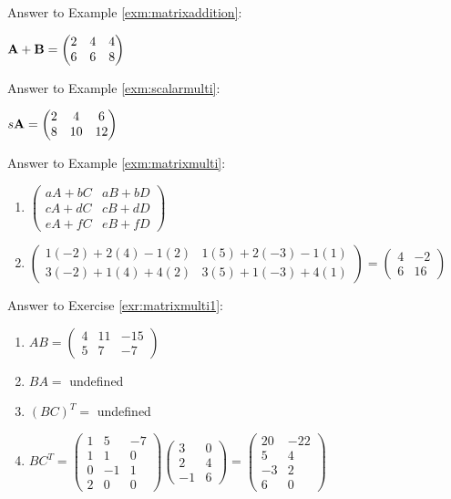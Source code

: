 \documentclass[]{book}
\theoremstyle{definition}
\theoremstyle{definition}
\theoremstyle{definition}
\theoremstyle{remark}
\begin{document}
Answer to Example \ref{exm:matrixaddition}:

\({\bf A+B}=\begin{pmatrix} 2 & 4 & 4 \\ 6 & 6 & 8 \end{pmatrix}\)

Answer to Example \ref{exm:scalarmulti}:

\(s {\bf A} = \begin{pmatrix} 2 & 4 & 6 \\ 8 & 10 & 12 \end{pmatrix}\)

Answer to Example \ref{exm:matrixmulti}:

\begin{enumerate}
\def\labelenumi{\arabic{enumi}.}
\item
  \(\begin{pmatrix} aA+bC&aB+bD\\cA+dC&cB+dD\\eA+fC&eB+fD \end{pmatrix}\)
\item
  \(\begin{pmatrix} 1(-2)+2(4)-1(2)&1(5)+2(-3)-1(1)\\  3(-2)+1(4)+4(2)&3(5)+1(-3)+4(1)\end{pmatrix} =  \begin{pmatrix} 4&-2\\6&16\end{pmatrix}\)
\end{enumerate}

Answer to Exercise \ref{exr:matrixmulti1}:

\begin{enumerate}
\def\labelenumi{\arabic{enumi}.}
\item
  \(AB = \begin{pmatrix} 4 & 11 & -15 \\ 5 & 7 & -7 \end{pmatrix}\)
\item
  \(BA =\) undefined
\item
  \((BC)^T =\) undefined
\item
  \(BC^T = \begin{pmatrix} 1&5&-7\\1&1&0\\0&-1&1\\2&0&0\end{pmatrix}\begin{pmatrix} 3&0\\2&4\\-1&6 \end{pmatrix} =\begin{pmatrix}20 & -22 \\ 5 & 4 \\ -3 &2 \\6 & 0\end{pmatrix}\)
\end{enumerate}
\end{document}
